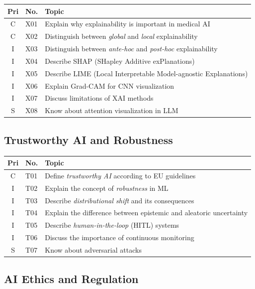 \documentclass[11pt,a4paper]{article}
\begin{document}
\begin{longtable}{@{}clp{9cm}@{}}
\toprule
\textbf{Pri} & \textbf{No.} & \textbf{Topic} \\
\midrule
\endfirsthead
\midrule
\endhead
\midrule
\endfoot
\bottomrule
\endlastfoot
C & X01 & Explain why explainability is important in medical AI \\
C & X02 & Distinguish between \emph{global} and \emph{local} explainability \\
I & X03 & Distinguish between \emph{ante-hoc} and \emph{post-hoc} explainability \\
I & X04 & Describe SHAP (SHapley Additive exPlanations) \\
I & X05 & Describe LIME (Local Interpretable Model-agnostic Explanations) \\
I & X06 & Explain Grad-CAM for CNN visualization \\
I & X07 & Discuss limitations of XAI methods \\
S & X08 & Know about attention visualization in LLM \\
\end{longtable}

\subsection{Trustworthy AI and Robustness}

\begin{longtable}{@{}clp{9cm}@{}}
\toprule
\textbf{Pri} & \textbf{No.} & \textbf{Topic} \\
\midrule
\endfirsthead
\midrule
\endhead
\midrule
\endfoot
\bottomrule
\endlastfoot
C & T01 & Define \emph{trustworthy AI} according to EU guidelines \\
I & T02 & Explain the concept of \emph{robustness} in ML \\
I & T03 & Describe \emph{distributional shift} and its consequences \\
I & T04 & Explain the difference between epistemic and aleatoric uncertainty \\
I & T05 & Describe \emph{human-in-the-loop} (HITL) systems \\
I & T06 & Discuss the importance of continuous monitoring \\
S & T07 & Know about adversarial attacks \\
\end{longtable}

\subsection{AI Ethics and Regulation}
\end{document}
